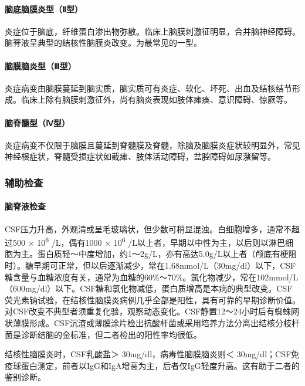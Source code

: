\paragraph{脑底脑膜炎型（Ⅱ型）}

炎症位于脑底，纤维蛋白渗出物弥散。临床上脑膜刺激征明显，合并脑神经障碍。脑脊液呈典型的结核性脑膜炎改变。为最常见的一型。

\paragraph{脑膜脑炎型（Ⅲ型）}

炎症病变由脑膜蔓延到脑实质，脑实质可有炎症、软化、坏死、出血及结核结节形成。临床上除有脑膜刺激征外，尚有脑炎表现如肢体瘫痪、意识障碍、惊厥等。

\paragraph{脑脊髓型（Ⅳ型）}

炎症病变不仅限于脑膜且蔓延到脊髓膜及脊髓，除脑及脑膜炎症状较明显外，常见神经根症状，脊髓受损症状如截瘫、肢体活动障碍，盆腔障碍如尿潴留等。

\subsubsection{辅助检查}

\paragraph{脑脊液检查}

CSF压力升高，外观清或呈毛玻璃状，但少数可稍显混浊。白细胞增多，通常不超过500
× 10\textsuperscript{6} /L，偶有1000 × 10\textsuperscript{6}
/L以上者，早期以中性为主，以后则以淋巴细胞为主。蛋白质轻～中度增加，约1～2g/L，亦有高达5.0g/L以上者（颅底有梗阻时）。糖早期可正常，但以后逐渐减少，常在1.68mmol/L（30mg/dl）以下，CSF糖含量与血糖浓度有关，通常为血糖的60\%～70\%。氯化物减少，常在102mmol/L（600mg/dl）以下。CSF糖和氯化物减低，蛋白质增高是本病的典型改变。CSF荧光素钠试验，在结核性脑膜炎病例几乎全部是阳性，具有可靠的早期诊断价值。对CSF改变不典型者须重复化验，观察动态变化。CSF静置12～24小时后有蜘蛛网状薄膜形成。CSF沉渣或薄膜涂片检出抗酸杆菌或采用培养方法分离出结核分枝杆菌是诊断结脑的金标准，但二者检出的阳性率均很低。

结核性脑膜炎时，CSF乳酸盐＞ 30mg/dl，病毒性脑膜脑炎则＜
30mg/dl；CSF免疫球蛋白测定，前者以IgG和IgA增高为主，后者仅IgG轻度升高。这有助于二者的鉴别诊断。

